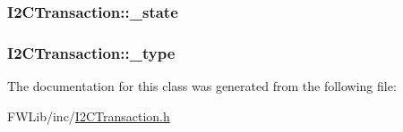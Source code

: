 \label{class_i2_c_transaction_a3c04420a4def944e055fd66b262a51c7}
\hypertarget{class_i2_c_transaction_a5daa64c9e4deb1ff734be7666c31bc46}{
\subsubsection[{\_\-state}]{ {\bf I2CTransaction::\_\-state}}}
\label{class_i2_c_transaction_a5daa64c9e4deb1ff734be7666c31bc46}
\hypertarget{class_i2_c_transaction_ad74d7751b9a37ffdf302da62a9ed804e}{
\subsubsection[{\_\-type}]{ {\bf I2CTransaction::\_\-type}}}
\label{class_i2_c_transaction_ad74d7751b9a37ffdf302da62a9ed804e}


The documentation for this class was generated from the following file:\begin{DoxyCompactItemize}
\item 
FWLib/inc/\hyperlink{_i2_c_transaction_8h}{I2CTransaction.h}\end{DoxyCompactItemize}
